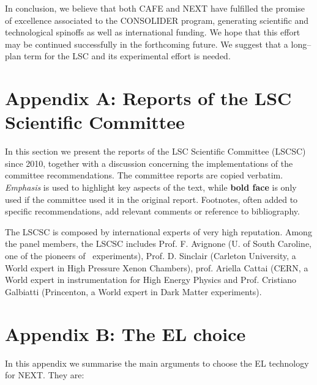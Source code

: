 \documentclass[a4paper,11pt,oneside]{article}
\begin{document}
In conclusion, we believe that both CAFE and NEXT have fulfilled the promise of excellence associated to the CONSOLIDER program, generating scientific and technological spinoffs as well as international funding. We hope that this effort may be continued successfully in the forthcoming future. We suggest that a long--plan term for the LSC and its experimental effort is needed. 
\newpage  

\section{\bf \textsf{Appendix A: Reports of the LSC Scientific Committee }}
In this section we present the reports of the LSC Scientific Committee (LSCSC) since 2010, together with a discussion concerning the implementations of the committee recommendations. The committee reports are copied verbatim. {\em Emphasis} is used to highlight key aspects of the text, while {\bf bold face} is only used if the committee used it in the original report. Footnotes, often added to specific recommendations, add relevant comments or reference to bibliography. 

The LSCSC is composed by international experts of very high reputation. Among the panel members, the LSCSC includes Prof. F. Avignone (U. of South Caroline, one of the pioneers of \bbonu\ experiments), Prof. D. Sinclair (Carleton University, a World expert in High Pressure Xenon Chambers), prof. Ariella Cattai (CERN, a World expert in instrumentation for High Energy Physics and Prof. Cristiano Galbiatti (Princenton, a World expert in Dark Matter experiments).  








\section{\bf \textsf{Appendix B: The EL choice}}

In this appendix we summarise the main arguments to choose the EL technology for NEXT. They are:
\end{document}
